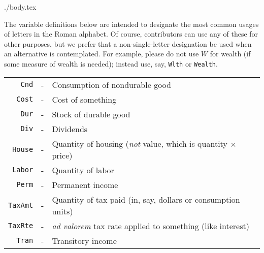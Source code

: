 \documentclass{econtex}
\begin{document}
\begin{verbatimwrite}{./body.tex}

The variable definitions below are intended to designate the most common usages of letters in the Roman alphabet.  Of course, contributors can use any of these for other purposes, but we prefer that a non-single-letter designation be used when an alternative is contemplated.  For example, please do not use $W$ for wealth (if some measure of wealth is needed); instead use, say, \texttt{Wlth} or \texttt{Wealth}. 

\begin{table}[h]
\begin{tabular}{rcl}
\\  \texttt{Cnd}   & - & Consumption of nondurable good
\\  \texttt{Cost}  & - & Cost of something 
\\  \texttt{Dur}   & - & Stock of durable good
\\  \texttt{Div}   & - & Dividends 
\\  \texttt{House} & - & Quantity of housing ({\it not} value, which is quantity $\times$ price)
\\  \texttt{Labor} & - & Quantity of labor
\\  \texttt{Perm}  & - & Permanent income
\\  \texttt{TaxAmt}& - & Quantity of tax paid (in, say, dollars or consumption units)
\\  \texttt{TaxRte}& - & {\it ad valorem} tax rate applied to something (like interest)
\\  \texttt{Tran}  & - & Transitory income
\end{tabular}
\end{table}

\end{verbatimwrite}

\end{document}
